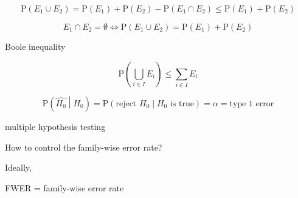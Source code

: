 \documentclass[
]{book}
\theoremstyle{definition}
\theoremstyle{definition}
\theoremstyle{definition}
\theoremstyle{definition}
\theoremstyle{remark}
\begin{document}
\[
\mathrm{P}\left(E_{{\scriptscriptstyle 1}}\cup E_{{\scriptscriptstyle 2}}\right)=\mathrm{P}\left(E_{{\scriptscriptstyle 1}}\right)+\mathrm{P}\left(E_{{\scriptscriptstyle 2}}\right)-\mathrm{P}\left(E_{{\scriptscriptstyle 1}}\cap E_{{\scriptscriptstyle 2}}\right)\le\mathrm{P}\left(E_{{\scriptscriptstyle 1}}\right)+\mathrm{P}\left(E_{{\scriptscriptstyle 2}}\right)
\]

\[
E_{{\scriptscriptstyle 1}}\cap E_{{\scriptscriptstyle 2}}=\emptyset\Leftrightarrow\mathrm{P}\left(E_{{\scriptscriptstyle 1}}\cup E_{{\scriptscriptstyle 2}}\right)=\mathrm{P}\left(E_{{\scriptscriptstyle 1}}\right)+\mathrm{P}\left(E_{{\scriptscriptstyle 2}}\right)
\]

Boole inequality

\[
\mathrm{P}\left(\bigcup\limits _{i\in I}E_{{\scriptscriptstyle i}}\right)\le\sum\limits _{i\in I}E_{{\scriptscriptstyle i}}
\]

\[
\mathrm{P}\left(\overbrace{H_{{\scriptscriptstyle 0}}}\middle|H_{{\scriptscriptstyle 0}}\right)=\mathrm{P}\left(\text{reject }H_{{\scriptscriptstyle 0}}\middle|H_{{\scriptscriptstyle 0}}\text{ is true}\right)=\alpha=\text{type 1 error}
\]

multiple hypothesis testing

How to control the family-wise error rate?

Ideally,

FWER = family-wise error rate
\end{document}
